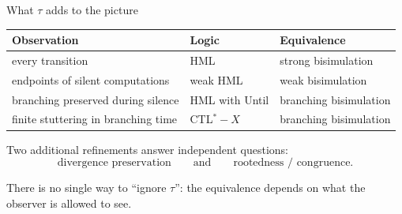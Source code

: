\documentclass[handout,aspectratio=169,11pt]{beamer}
\newcommand{\wb}{\mathrel{\approx_{\mathrm w}}}
\newcommand{\nil}{\mathbf 0}
\newcommand{\Takeaway}[1]{\begin{exampleblock}{}#1\end{exampleblock}}
\begin{document}
\begin{frame}{What $\tau$ adds to the picture}
  \begin{center}
  \renewcommand{\arraystretch}{1.45}
  \begin{tabular}{@{}lll@{}}
    \textbf{Observation} &
    \textbf{Logic} &
    \textbf{Equivalence}\\
    \hline
    every transition &
    HML &
    strong bisimulation\\

    endpoints of silent computations &
    weak HML &
    weak bisimulation\\

    branching preserved during silence &
    HML with Until &
    branching bisimulation\\

    finite stuttering in branching time &
    CTL$^{*}{-}X$ &
    branching bisimulation\\
  \end{tabular}
  \end{center}

  \vspace{4mm}

  Two additional refinements answer independent questions:
  \[
      \text{divergence preservation}
      \qquad\text{and}\qquad
      \text{rootedness / congruence}.
  \]

  \Takeaway{There is no single way to ``ignore $\tau$'':
  the equivalence depends on what the observer is allowed to see.}
\end{frame}

\end{document}
